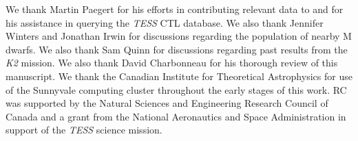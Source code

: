\documentclass[twocolumn]{emulateapj}
\newcommand{\ktwo}[1]{\emph{K2}#1}
\newcommand{\tess}[1]{\emph{TESS}#1}
\begin{document}
\acknowledgements
We thank Martin Paegert for his efforts in contributing relevant data to and for his assistance in querying the \tess{}
CTL database. We also thank Jennifer Winters and Jonathan Irwin for discussions regarding the population of nearby
M dwarfs. We also thank Sam Quinn for discussions regarding past results from the \ktwo{} mission.
We also thank David Charbonneau for his thorough review of this manuscript.
We thank the Canadian Institute for Theoretical Astrophysics for use of the Sunnyvale computing cluster
throughout the early stages of this work. RC was supported by the Natural Sciences and Engineering Research Council of
Canada and a grant from the National Aeronautics and Space Administration in support of the \tess{} science mission.



\end{document}

